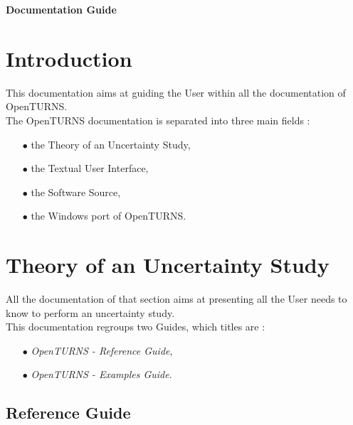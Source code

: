 \documentclass[11pt]{article}
\begin{document}
\begin{titlepage}
  \vspace*{2cm}
  \begin{center}
    {\huge \bf Documentation Guide}
    
  \end{center}
\end{titlepage}
\newpage
\tableofcontents


\newpage

\section{Introduction}

This documentation aims at guiding the User within all the documentation of OpenTURNS.\\

The OpenTURNS documentation is separated into three main fields :
\begin{itemize}
\item[$\bullet$]  the Theory of an Uncertainty Study,
\item[$\bullet$]  the Textual User Interface,
\item[$\bullet$]  the Software Source,
\item[$\bullet$]  the Windows port of OpenTURNS.
\end{itemize}

\section{Theory of an Uncertainty Study}

All the documentation of that section aims at presenting all the User needs to know to perform an uncertainty study.\\

This documentation regroups two Guides, which titles are :
\begin{itemize}
\item[$\bullet$] {\itshape OpenTURNS - Reference Guide},
\item[$\bullet$] {\itshape OpenTURNS - Examples Guide}.
\end{itemize}

\subsection{Reference Guide}
\end{document}
